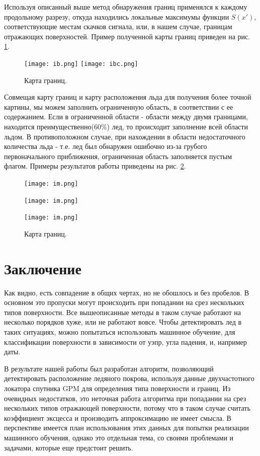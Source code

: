 Используя описанный выше метод обнаружения границ применялся к каждому продольному разрезу, откуда находились локальные
максимумы функции $S(x')$, соответствующие местам скачков сигнала, или, в нашем случае, границам отражающих
поверхностей. Пример полученной карты границ приведен на рис. \ref{fig:10}.

\begin{figure}[h!]
  \centering
  \texttt{[image: ib.png]}
  \texttt{[image: ibc.png]}
  \caption{Карта границ.}
  \label{fig:10}
\end{figure}

Совмещая карту границ и карту расположения льда для получения более точной картины, мы можем заполнить ограниченную
область, в соответствии с ее содержанием. Если в ограниченной области - области между двумя границами, находится
преимущественно(60\%) лед, то происходит заполнение всей
области льдом. В противоположном случае, при нахождении в области недостаточного количества льда - т.е. лед был
обнаружен ошибочно из-за грубого первоначального приближения, ограниченная область заполняется пустым флагом.
Примеры результатов работы приведены на рис. \ref{fig:11}.

\begin{figure}[h!]
  \centering
  \begin{minipage}{0.32\linewidth}
    \texttt{[image: im.png]}
  \end{minipage}
  \begin{minipage}{0.32\linewidth}
    \texttt{[image: im.png]}
  \end{minipage}
  \begin{minipage}{0.32\linewidth}
    \texttt{[image: im.png]}
  \end{minipage}
  \caption{Карта границ.}
  \label{fig:11}
\end{figure}


\section{Заключение}
Как видно, есть совпадение в общих чертах, но не обошлось и без пробелов. В основном это пропуски могут происходить при
попадании на срез нескольких типов поверхности. Все вышеописанные методы в таком случае работают на несколько порядков
хуже, или не работают вовсе. Чтобы детектировать лед в таких ситуациях, можно попытаться использовать машинное обучение,
для классификации поверхности в зависимости от уэпр, угла падения, и, например даты.


В результате нашей работы был разработан алгоритм, позволяющий детектировать расположение ледяного покрова, используя
данные двухчастотного локатора спутника GPM для определения типа поверхности и границ.
Из очевидных недостатков, это неточная работа алгоритма при попадании на срез нескольких типов отражающей поверхности,
потому что в таком случае считать коэффициент эксцесса и производить аппроксимацию не имеет смысла. 
В перспективе имеется план использования этих данных для попытки реализации машинного обучения, однако это отдельная
тема, со своими проблемами и задачами, которые еще предстоит решить. 


